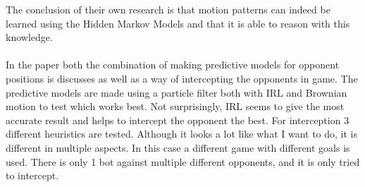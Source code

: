 \documentclass{article}
\begin{document}
The conclusion of their own research is that motion patterns can indeed be learned using the Hidden Markov Models and that it is able to reason with this knowledge.
\\\\
In the paper \citep{6374144} both the combination of making predictive models for opponent positions is discusses as well as a way of intercepting the opponents in game. The predictive models are made using a particle filter both with IRL and Brownian motion  to test which works best. Not surprisingly, IRL seems to give the most accurate result and helps to intercept the opponent the best. For interception 3 different heuristics are tested. Although it looks a lot like what I want to do, it is different in multiple aspects. In this case a different game with different goals is used. There is only 1 bot against multiple different opponents, and it is only tried to intercept.


\end{document}
